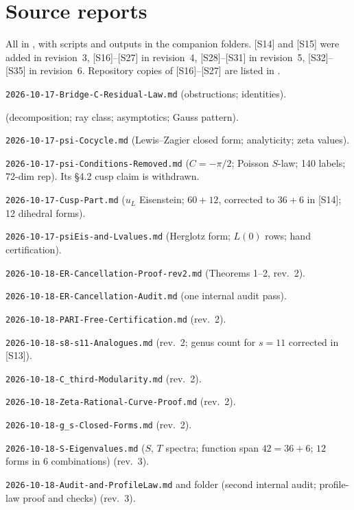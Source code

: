 \documentclass[11pt]{article}
\theoremstyle{definition}
\begin{document}
\section*{Source reports}\label{sec:sources}
All in , with scripts and outputs in the companion folders. [S14] and [S15] were added in revision~3,
[S16]--[S27] in revision~4, [S28]--[S31] in revision~5, [S32]--[S35] in revision~6. Repository copies of [S16]--[S27] are listed in .
\begin{enumerate}[label={[S\arabic*]},leftmargin=3em]
\item \texttt{2026-10-17-Bridge-C-Residual-Law.md} (obstructions; identities).
\item {} (decomposition; ray class; asymptotics; Gauss pattern).
\item \texttt{2026-10-17-psi-Cocycle.md} (Lewis--Zagier closed form; analyticity; zeta values).
\item \texttt{2026-10-17-psi-Conditions-Removed.md} ($C=-\pi/2$; Poisson $S$-law; 140 labels; 72-dim rep). Its \S4.2 cusp claim is withdrawn.
\item \texttt{2026-10-17-Cusp-Part.md} ($u_L$ Eisenstein; $60+12$, corrected to $36+6$ in [S14]; 12 dihedral forms).
\item \texttt{2026-10-17-psiEis-and-Lvalues.md} (Herglotz form; $L(0)$ rows; hand certification).
\item \texttt{2026-10-18-ER-Cancellation-Proof-rev2.md} (Theorems 1--2, rev.~2).
\item \texttt{2026-10-18-ER-Cancellation-Audit.md} (one internal audit pass).
\item \texttt{2026-10-18-PARI-Free-Certification.md} (rev.~2).
\item \texttt{2026-10-18-s8-s11-Analogues.md} (rev.~2; genus count for $s=11$ corrected in [S13]).
\item \texttt{2026-10-18-C\_third-Modularity.md} (rev.~2).
\item \texttt{2026-10-18-Zeta-Rational-Curve-Proof.md} (rev.~2).
\item \texttt{2026-10-18-g\_s-Closed-Forms.md} (rev.~2).
\item \texttt{2026-10-18-S-Eigenvalues.md} ($S$, $T$ spectra; function span $42=36+6$; $12$ forms in $6$ combinations) (rev.~3).
\item \texttt{2026-10-18-Audit-and-ProfileLaw.md} and folder  (second internal audit; profile-law proof and checks) (rev.~3).

\end{enumerate}
\end{document}
